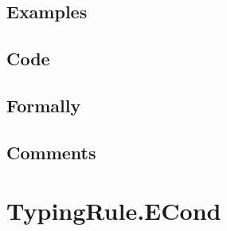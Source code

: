\documentclass{book}
\begin{document}
  \subsection{Examples}

  \subsection{Code}

  \subsection{Formally}

  \subsection{Comments}

\section{TypingRule.ECond \label{sec:TypingRule.ECond}}
\end{document}
